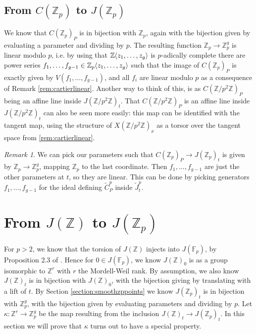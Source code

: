 \documentclass[12pt]{article}
\newcommand{\Z}{\mathbb{Z}}
\newcommand{\F}{\mathbb{F}}
\renewcommand{\angle}[1]{\hspace{-2pt}\left\langle #1 \right\rangle}
\theoremstyle{plain}
\theoremstyle{definition}
\theoremstyle{remark}
\newtheorem{rem}[thm]{Remark} %
\begin{document}
\subsection{From \texorpdfstring{$C(\Z_p)$}{C(Z\_p)} to \texorpdfstring{$J(\Z_p)$}{J(Z\_p)}}
\label{subsection:czptojzp}
We know that $C(\Z_p)_P$ is in bijection with $\Z_p$, again with the bijection given by evaluating a parameter and dividing by $p$. The resulting function $\Z_p \to \Z_p^g$ is linear modulo $p$, i.e. by using that $\Z\angle{z_1,\dots,z_g}$ is $p$-adically complete there are power series $f_1,\dots,f_{g-1} \in \Z_p\angle{z_1,\dots,z_g}$ such that the image of $C(\Z_p)_P$ is exactly given by $V(f_1,\dots,f_{g-1})$, and all $f_i$ are linear modulo $p$ as a consequence of Remark \ref{rem:cartierlinear}. Another way to think of this, is as $C(\Z/p^2\Z)_P$ being an affine line inside $J(\Z/p^2\Z)_t$. That $C(\Z/p^2\Z)_P$ is an affine line inside $J(\Z/p^2\Z)_t$ can also be seen more easily: this map can be identified with the tangent map, using the structure of $X(\Z/p^2\Z)_x$ as a torsor over the tangent space from \ref{rem:cartierlinear}.

\begin{rem}
\label{rem:fislinear}
We can pick our parameters such that $C(\Z_p)_P \to J(\Z_p)_t$ is given by $\Z_p \to \Z_p^g$, mapping $\Z_p$ to the last coordinate. Then $f_1,\dots,f_{g-1}$ are just the other parameters at $t$, so they are linear. This can be done by picking generators $f_1,\dots,f_{g-1}$ for the ideal defining $\widetilde{C}_P^p$ inside $\widetilde{J}_t^p$.
\end{rem}

\section{From \texorpdfstring{$J(\Z)$}{J(Z)} to \texorpdfstring{$J(\Z_p)$}{J(Z\_p)}}
\label{section:kappa}
For $p > 2$, we know that the torsion of $J(\Z)$ injects into $J(\F_p)$, by Proposition 2.3 of \cite{pierre2000}. Hence for $0 \in J(\F_p)$, we know $J(\Z)_0$ is as a group isomorphic to $\Z^r$ with $r$ the Mordell-Weil rank. By assumption, we also know $J(\Z)_t$ is in bijection with $J(\Z)_0$, with the bijection giving by translating with a lift of $t$. By Section \ref{section:smoothzppoints} we know $J(\Z_p)_t$ is in bijection with $\Z_p^{g}$, with the bijection given by evaluating parameters and dividing by $p$. Let $\kappa: \Z^r \to \Z_p^g$ be the map resulting from the inclusion $J(\Z)_t \to J(\Z_p)_t$. In this section we will prove that $\kappa$ turns out to have a special property.
\end{document}
